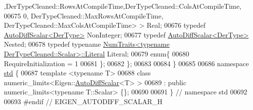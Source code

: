 \begin{DoxyCode}
      ,DerTypeCleaned::RowsAtCompileTime,DerTypeCleaned::ColsAtCompileTime,
00675                                 0, DerTypeCleaned::MaxRowsAtCompileTime, 
      DerTypeCleaned::MaxColsAtCompileTime> > Real;
00676   \textcolor{keyword}{typedef} \hyperlink{class_eigen_1_1_auto_diff_scalar}{AutoDiffScalar<DerType>} NonInteger;
00677   \textcolor{keyword}{typedef} \hyperlink{class_eigen_1_1_auto_diff_scalar}{AutoDiffScalar<DerType>} Nested;
00678   \textcolor{keyword}{typedef} \textcolor{keyword}{typename} \hyperlink{group___core___module_struct_eigen_1_1_num_traits}{NumTraits<typename DerTypeCleaned::Scalar>::Literal}
       Literal;
00679   \textcolor{keyword}{enum}\{
00680     RequireInitialization = 1
00681   \};
00682 \};
00683 
00684 \}
00685 
00686 \textcolor{keyword}{namespace }\hyperlink{namespacestd}{std} \{
00687 \textcolor{keyword}{template} <\textcolor{keyword}{typename} T>
00688 \textcolor{keyword}{class }numeric\_limits<Eigen::\hyperlink{class_eigen_1_1_auto_diff_scalar}{AutoDiffScalar}<T> >
00689   : \textcolor{keyword}{public} numeric\_limits<typename T::Scalar> \{\};
00690 
00691 \}  \textcolor{comment}{// namespace std}
00692 
00693 \textcolor{preprocessor}{#endif // EIGEN\_AUTODIFF\_SCALAR\_H}
\end{DoxyCode}
